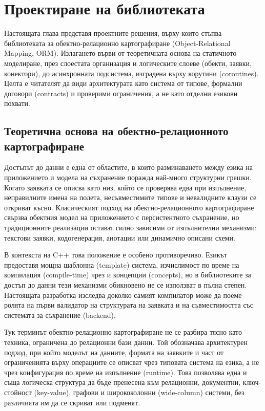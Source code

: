 \section{Проектиране на библиотеката}
\label{sec:design}

Настоящата глава представя проектните решения, върху които стъпва библиотеката за обектно-релационно картографиране (Object-Relational Mapping, ORM). Излагането върви от теоретичната основа на статичното моделиране, през слоестата организация и логическите слоеве (обекти, заявки, конектори), до асинхронната подсистема, изградена върху корутини (coroutines). Целта е читателят да види архитектурата като система от типове, формални договори (contracts) и проверими ограничения, а не като отделни езикови похвати.

\subsection{Теоретична основа на обектно-релационното картографиране}

Достъпът до данни е една от областите, в които разминаването между езика на приложението и модела на съхранение поражда най-много структурни грешки. Когато заявката се описва като низ, който се проверява едва при изпълнение, неправилните имена на полета, несъвместимите типове и невалидните клаузи се откриват късно. Класическият подход на обектно-релационното картографиране~\cite{fowler2002} свързва обектния модел на приложението с персистентното съхранение, но традиционните реализации остават силно зависими от изпълнителни механизми: текстови заявки, кодогенерация, анотации или динамично описани схеми.

В контекста на C++ това положение е особено противоречиво. Езикът предоставя мощна шаблонна (template) система, изчислимост по време на компилация (compile-time) чрез  и концепции (concepts), но в библиотеките за достъп до данни тези механизми обикновено не се използват в пълна степен. Настоящата разработка изследва доколко самият компилатор може да поеме ролята на първи валидатор на структурата на заявката и на съвместимостта със системата за съхранение (backend).

Тук терминът обектно-релационно картографиране не се разбира тясно като техника, ограничена до релационни бази данни. Той обозначава архитектурен подход, при който моделът на данните, формата на заявките и част от ограниченията върху операциите се описват чрез типовата система на езика, а не чрез конфигурация по време на изпълнение (runtime). Това позволява една и съща логическа структура да бъде пренесена към релационни, документни, ключ-стойност (key-value), графови и ширококолонни (wide-column) системи, без различията им да се скриват или подменят.

